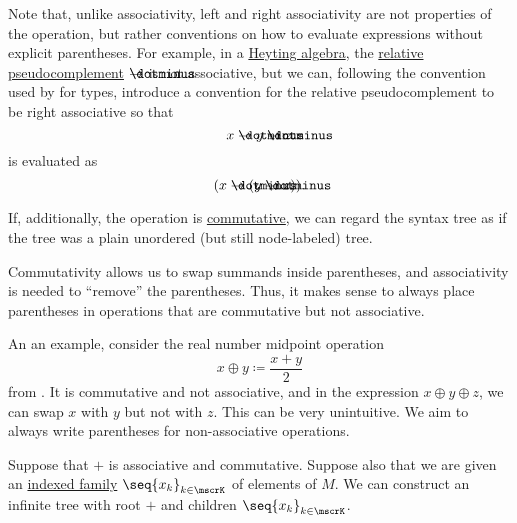 \begin{remark}
\begin{thmenum}
    Note that, unlike associativity, left and right associativity are not properties of the operation, but rather conventions on how to evaluate expressions without explicit parentheses. For example, in a \hyperref[def:heyting_algebra]{Heyting algebra}, the \hyperref[def:heyting_algebra]{relative pseudocomplement} \( \synimplies \) is not associative, but we can, following the convention used by  for types, introduce a convention for the relative pseudocomplement to be right associative so that
    \begin{equation*}
      x \synimplies y \synimplies z
    \end{equation*}
    is evaluated as
    \begin{equation*}
      (x \synimplies (y \synimplies z)).
    \end{equation*}

     If, additionally, the operation is \hyperref[def:binary_operation/commutative]{commutative}, we can regard the syntax tree as if the tree was a plain unordered (but still node-labeled) tree.

    Commutativity allows us to swap summands inside parentheses, and associativity is needed to \enquote{remove} the parentheses. Thus, it makes sense to always place parentheses in operations that are commutative but not associative.

    An an example, consider the real number midpoint operation
    \begin{equation*}
      x \oplus y \coloneqq \frac {x + y} 2
    \end{equation*}
    from . It is commutative and not associative, and in the expression \( x \oplus y \oplus z \), we can swap \( x \) with \( y \) but not with \( z \). This can be very unintuitive. We aim to always write parentheses for non-associative operations.

     Suppose that \( + \) is associative and commutative. Suppose also that we are given an \hyperref[def:cartesian_product/indexed_family]{indexed family} \( \seq{ x_k }_{k \in \mscrK} \) of elements of \( M \). We can construct an infinite tree with root \( + \) and children \( \seq{ x_k }_{k \in \mscrK} \).


\end{thmenum}
\end{remark}
